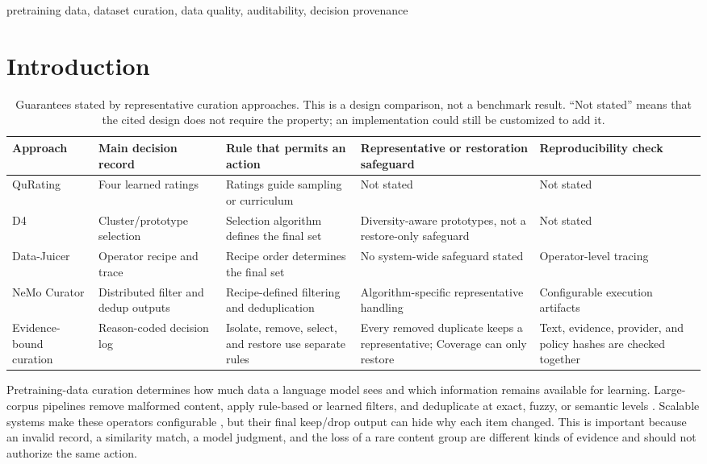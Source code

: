 \documentclass[conference]{IEEEtran}
\begin{document}
\begin{IEEEkeywords}
pretraining data, dataset curation, data quality, auditability, decision
provenance
\end{IEEEkeywords}

\section{Introduction}
\begin{table}[!t]
\caption{Guarantees stated by representative curation approaches. This is a
design comparison, not a benchmark result. ``Not stated'' means that the cited
design does not require the property; an implementation could still be
customized to add it.}
\label{tab:responsibility}
\centering
\footnotesize
\renewcommand{\arraystretch}{1.08}
\setlength{\tabcolsep}{3.2pt}
\begin{tabular}{@{}L{0.13\textwidth}L{0.19\textwidth}L{0.21\textwidth}L{0.21\textwidth}L{0.18\textwidth}@{}}
\toprule
Approach & Main decision record & Rule that permits an action & Representative or restoration safeguard & Reproducibility check \\
\midrule
QuRating \cite{wettig2024qurating} & Four learned ratings & Ratings guide sampling or curriculum & Not stated & Not stated \\
D4 \cite{tirumala2023d4} & Cluster/prototype selection & Selection algorithm defines the final set & Diversity-aware prototypes, not a restore-only safeguard & Not stated \\
Data-Juicer \cite{chen2023datajuicer} & Operator recipe and trace & Recipe order determines the final set & No system-wide safeguard stated & Operator-level tracing \\
NeMo Curator \cite{nvidia2026nemo} & Distributed filter and dedup outputs & Recipe-defined filtering and deduplication & Algorithm-specific representative handling & Configurable execution artifacts \\
Evidence-bound curation & Reason-coded decision log & Isolate, remove, select, and restore use separate rules & Every removed duplicate keeps a representative; Coverage can only restore & Text, evidence, provider, and policy hashes are checked together \\
\bottomrule
\end{tabular}
\end{table}

Pretraining-data curation determines how much data a language model sees and
which information remains available for learning. Large-corpus pipelines remove
malformed content, apply rule-based or learned filters, and deduplicate at
exact, fuzzy, or semantic levels
\cite{raffel2020c4,penedo2024fineweb,soldaini2024dolma,li2024datacomp}.
Scalable systems make these operators configurable
\cite{nvidia2026nemo,chen2023datajuicer}, but their final keep/drop output can
hide why each item changed. This is important because an invalid record, a
similarity match, a model judgment, and the loss of a rare content group are
different kinds of evidence and should not authorize the same action.
\end{document}
